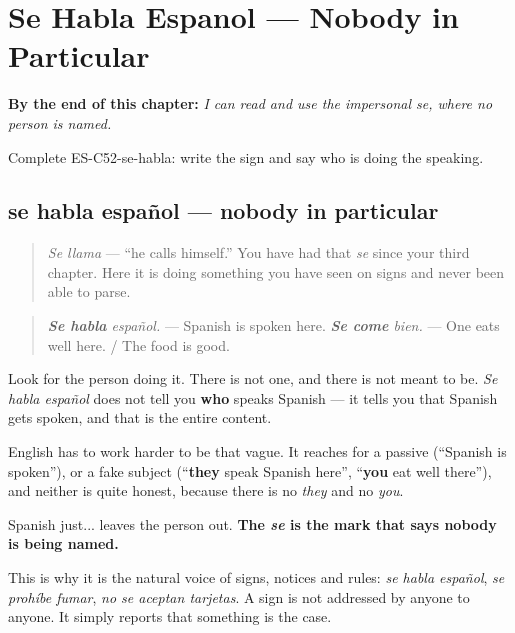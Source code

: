
\chapter{Se Habla Espanol --- Nobody in Particular}
\label{ch:se-impersonal}

\begin{chapteropening}
\textbf{By the end of this chapter:} \emph{I can read and use the impersonal se, where no person is named.}

Complete ES-C52-se-habla: write the sign and say who is doing the speaking.
\end{chapteropening}

\section[se habla español]{se habla español — nobody in particular}

\label{lesson:ES-C52-se-habla}



\begin{quote}
\emph{Se llama} — \textquotedblleft{}he calls himself.\textquotedblright{} You have had that \emph{se} since your third chapter. Here it is doing something you have seen on signs and never been able to parse.
\end{quote}

\begin{grammarlens}[title={Grammar Lens: a sentence with nobody in it}]
\begin{quote}
\emph{\textbf{Se habla} español.} — Spanish is spoken here. \emph{\textbf{Se come} bien.} — One eats well here. / The food is good.
\end{quote}

Look for the person doing it. There is not one, and there is not meant to be. \emph{Se habla español} does not tell you \textbf{who} speaks Spanish — it tells you that Spanish gets spoken, and that is the entire content.

English has to work harder to be that vague. It reaches for a passive (\textquotedblleft{}Spanish is spoken\textquotedblright{}), or a fake subject (\textquotedblleft{}\textbf{they} speak Spanish here\textquotedblright{}, \textquotedblleft{}\textbf{you} eat well there\textquotedblright{}), and neither is quite honest, because there is no \emph{they} and no \emph{you}.

Spanish just... leaves the person out. \textbf{The \emph{se} is the mark that says nobody is being named.}

This is why it is the natural voice of signs, notices and rules: \emph{se habla español}, \emph{se prohíbe fumar}, \emph{no se aceptan tarjetas}. A sign is not addressed by anyone to anyone. It simply reports that something is the case.
\end{grammarlens}

